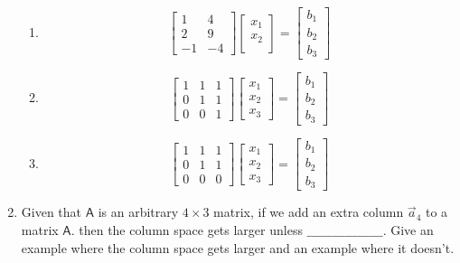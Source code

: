\documentclass[a4paper, 11pt]{article}
\newcommand{\mat}[1]{\boldsymbol { \mathsf{#1}} }
\begin{document}
\begin{enumerate}
\begin{enumerate}
\item
\[ 
\left[ \begin{array}{cc}
1  &   4 \\
2  &  9 \\
-1 & -4 
\end{array} \right]
%
\left[ \begin{array}{c}
 x_1\\
 x_2\\
\end{array} \right]
%
= \left[ \begin{array}{c}
 b_1\\
 b_2\\
 b_3 
\end{array} \right]
\]
\item 
\[ 
\left[ \begin{array}{ccc}
1  & 1 & 1\\
0  & 1 & 1\\
0 & 0 & 1
\end{array} \right]
%
\left[ \begin{array}{c}
 x_1\\
 x_2\\
x_3
\end{array} \right]
%
= \left[ \begin{array}{c}
 b_1\\
 b_2\\
 b_3 
\end{array} \right]
\]
\item
\[
 \left[ \begin{array}{ccc}
1  & 1 & 1\\
0  & 1 & 1\\
0 & 0 & 0
\end{array} \right]
%
\left[ \begin{array}{c}
 x_1\\
 x_2\\
x_3
\end{array} \right]
%
= \left[ \begin{array}{c}
 b_1\\
 b_2\\
 b_3 
\end{array} \right]
\]

\end{enumerate}

\item Given that $\mat A$ is an arbitrary $4 \times 3$ matrix, if we add an extra column $\vec a_4$ to a matrix $\mat A$. then the column space gets larger unless $\_ \_ \_\_ \_ \_\_ \_ \_\_ \_ \_\_ \_ \_\_ \_ \_$. Give an example where the column space gets larger and an example where it doesn't. 


\end{enumerate}
\end{document}
